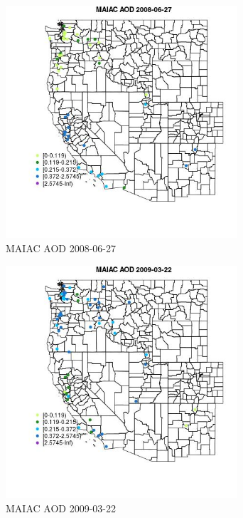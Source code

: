 \begin{figure} 
\centering  
\includegraphics[width=0.77\textwidth]{Code_Outputs/Report_ML_input_PM25_Step4_part_e_de_duplicated_aves_MapObsMAIAC_AOD2008-06-27.jpg} 
\caption{\label{fig:Report_ML_input_PM25_Step4_part_e_de_duplicated_avesMapObsMAIAC_AOD2008-06-27}MAIAC AOD 2008-06-27} 
\end{figure} 
 

\begin{figure} 
\centering  
\includegraphics[width=0.77\textwidth]{Code_Outputs/Report_ML_input_PM25_Step4_part_e_de_duplicated_aves_MapObsMAIAC_AOD2009-03-22.jpg} 
\caption{\label{fig:Report_ML_input_PM25_Step4_part_e_de_duplicated_avesMapObsMAIAC_AOD2009-03-22}MAIAC AOD 2009-03-22} 
\end{figure} 
 

